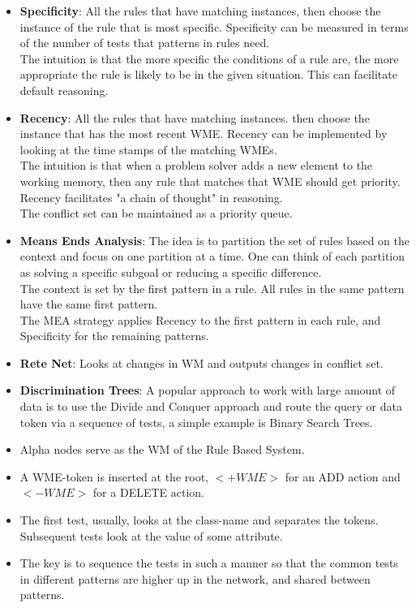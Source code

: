 \documentclass[a4paper]{article}
\begin{document}
\begin{itemize}
    \item \textbf{Specificity}: All the rules that have matching instances, then choose the instance of the rule that is most specific. Specificity can be measured in terms of the number of tests that patterns in rules need.\\
    The intuition is that the more specific the conditions of a rule are, the more appropriate the rule is likely to be in the given situation. This can facilitate default reasoning.
    \item \textbf{Recency}: All the rules that have matching instances. then choose the instance that has the most recent WME. Recency can be implemented by looking at the time stamps of the matching WMEs.\\
    The intuition is that when a problem solver adds a new element to the working memory, then any rule that matches that WME should get priority. Recency facilitates "a chain of thought" in reasoning.\\
    The conflict set can be maintained as a priority queue.
    \item \textbf{Means Ends Analysis}: The idea is to partition the set of rules based on the context and focus on one partition at a time. One can think of each partition as solving a specific subgoal or reducing a specific difference.\\
    The context is set by the first pattern in a rule. All rules in the same pattern have the same first pattern.\\
    The MEA strategy applies Recency to the first pattern in each rule, and Specificity for the remaining patterns.
    \item \textbf{Rete Net}: Looks at changes in WM and outputs changes in conflict set.
    \item \textbf{Discrimination Trees}: A popular approach to work with large amount of data is to use the Divide and Conquer approach and route the query or data token via a sequence of tests, a simple example is Binary Search Trees.
    \item Alpha nodes serve as the WM of the Rule Based System.
    \item A WME-token is inserted at the root, $<+WME>$ for an ADD action and $<-WME>$ for a DELETE action.
    \item The first test, usually, looks at the class-name and separates the tokens. Subsequent tests look at the value of some attribute.
    \item The key is to sequence the tests in such a manner so that the common tests in different patterns are higher up in the network, and shared between patterns.

\end{itemize}
\end{document}
